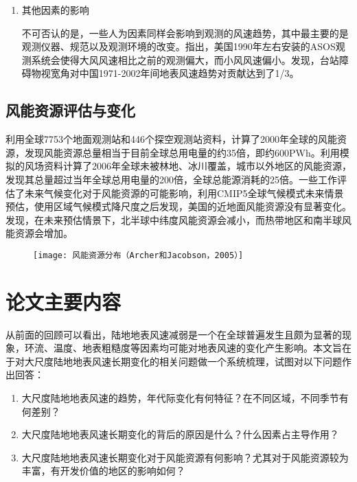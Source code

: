 \begin{enumerate}
\item 其他因素的影响

不可否认的是，一些人为因素同样会影响到观测的风速趋势，其中最主要的是观测仪器、规范以及观测环境的改变。\citet{mckee2000climate}指出，美国1990年左右安装的ASOS观测系统会使得大风风速相比之前的观测偏大，而小风风速偏小。\citet{刘学锋2012台站观测环境改变对我国近地面风速观测资料序列的影响}发现，台站障碍物视宽角对中国1971-2002年间地表风速趋势对贡献达到了1/3。

\end{enumerate}

\subsection{风能资源评估与变化}

\citet{archer2005evaluation}利用全球7753个地面观测站和446个探空观测站资料，计算了2000年全球的风能资源，发现风能资源总量相当于目前全球总用电量的约35倍，即约600PWh。\citet{lu2009global}利用模拟的风场资料计算了2006年全球未被林地、冰川覆盖，城市以外地区的风能资源，发现其总量超过当年全球总用电量的200倍，全球总能源消耗的25倍。一些工作评估了未来气候变化对于风能资源的可能影响，\citet{pryor2011assessing}利用CMIP5全球气候模式未来情景预估，使用区域气候模式降尺度之后发现，美国的近地面风能资源没有显著变化。\citet{karnauskas2018southward}发现，在未来预估情景下，北半球中纬度风能资源会减小，而热带地区和南半球风能资源会增加。

\begin{figure}[!htbp]
    \centering
    \texttt{[image: 风能资源分布（Archer和Jacobson，2005）]}
    \label{fig:windenergyArcher2005}
\end{figure}

\section{论文主要内容}

从前面的回顾可以看出，陆地地表风速减弱是一个在全球普遍发生且颇为显著的现象，环流、温度、地表粗糙度等因素均可能对地表风速的变化产生影响。本文旨在于对大尺度陆地地表风速长期变化的相关问题做一个系统梳理，试图对以下问题作出回答：

\begin{enumerate}
\item 大尺度陆地地表风速的趋势，年代际变化有何特征？在不同区域，不同季节有何差别？
\item 大尺度陆地地表风速长期变化的背后的原因是什么？什么因素占主导作用？
\item 大尺度陆地地表风速长期变化对于风能资源有何影响？尤其对于风能资源较为丰富，有开发价值的地区的影响如何？
\end{enumerate}

